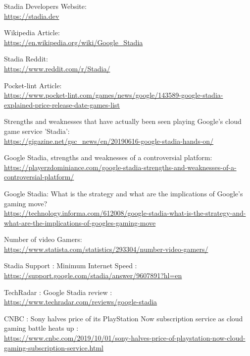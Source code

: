 \documentclass[a4paper,12pt]{article}
\newcommand{\link}[1]{{\color{blue}\href{#1}{#1}}}
\begin{document}
\newpage
{}
\begin{thebibliography}{9}

Stadia Developers Website: \\ \link{https://stadia.dev}

Wikipedia Article: \\ \link{https://en.wikipedia.org/wiki/Google\_Stadia}

Stadia Reddit: \\ \link{https://www.reddit.com/r/Stadia/}

Pocket-lint Article: \\ \link{https://www.pocket-lint.com/games/news/google/143589-google-stadia-explained-price-release-date-games-list}

Strengths and weaknesses that have actually been seen playing Google's cloud game service 'Stadia': 
\\ \link{https://gigazine.net/gsc\_news/en/20190616-google-stadia-hands-on/}

Google Stadia, strengths and weaknesses of a controversial platform: 
\\ \link{https://playerzdominiance.com/google-stadia-strengths-and-weaknesses-of-a-controversial-platform/}

Google Stadia: What is the strategy and what are the implications of Google's gaming move?
\\ \link{https://technology.informa.com/612008/google-stadia-what-is-the-strategy-and-what-are-the-implications-of-googles-gaming-move}

Number of video Gamers:
\\ \link{https://www.statista.com/statistics/293304/number-video-gamers/}

Stadia Support : Minimum Internet Speed : \\ \link{https://support.google.com/stadia/answer/9607891?hl=en}

TechRadar : Google Stadia review : \\ \link{https://www.techradar.com/reviews/google-stadia}

CNBC : Sony halves price of its PlayStation Now subscription service as cloud gaming battle heats up : \\ \link{https://www.cnbc.com/2019/10/01/sony-halves-price-of-playstation-now-cloud-gaming-subscription-service.html}


\end{thebibliography}
\end{document}
